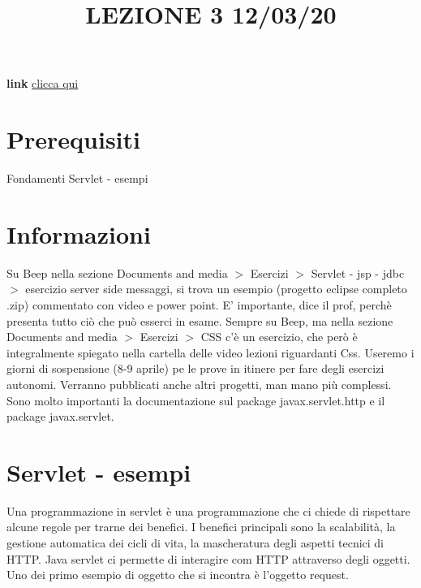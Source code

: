 \title{LEZIONE 3 12/03/20}\newline
\textbf{link} \href{https://web.microsoftstream.com/video/53d9a40e-3109-44fc-8195-0553eedfb6d9}{clicca qui}
\section*{Prerequisiti}
Fondamenti Servlet - esempi
\section*{Informazioni}
Su Beep nella sezione Documents and media $>$ Esercizi $>$ Servlet - jsp - jdbc $>$ esercizio server side messaggi, si trova un esempio (progetto eclipse completo .zip) commentato con video e power point. E' importante, dice il prof, perchè presenta tutto ciò che può esserci in esame.\newline
\newline
Sempre su Beep, ma nella sezione Documents and media $>$ Esercizi $>$ CSS c'è un esercizio, che però è integralmente spiegato nella cartella delle video lezioni riguardanti Css.\newline
\newline
Useremo i giorni di sospensione (8-9 aprile) pe le prove in itinere per fare degli esercizi autonomi.\newline
\newline
Verranno pubblicati anche altri progetti, man mano più complessi.\newline
\newline
Sono molto importanti la documentazione sul package javax.servlet.http e il package javax.servlet.
\section{Servlet - esempi}
Una programmazione in servlet è una programmazione che ci chiede di rispettare alcune regole per trarne dei benefici. I benefici principali sono la scalabilità, la gestione automatica dei cicli di vita, la mascheratura degli aspetti tecnici di HTTP. Java servlet ci permette di interagire com HTTP attraverso degli oggetti. Uno dei primo esempio di oggetto che si incontra è l'oggetto request.
